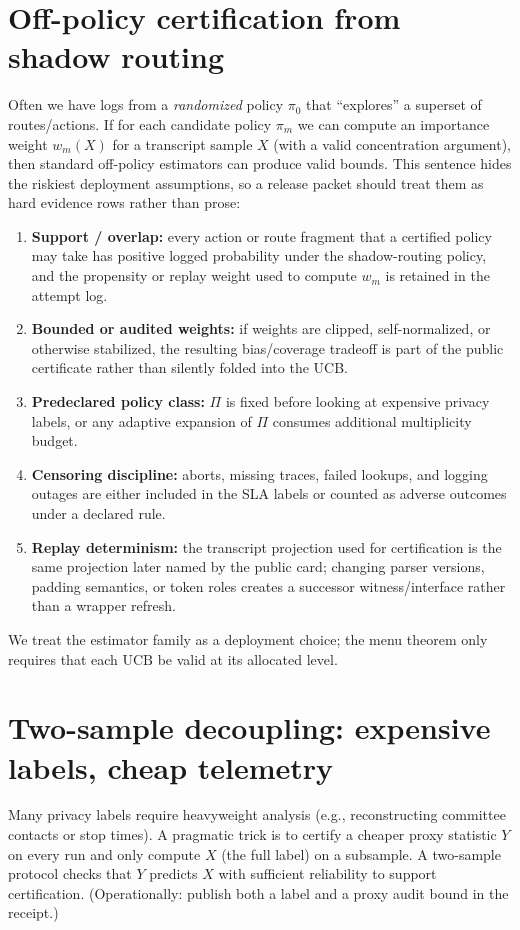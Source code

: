 \documentclass[11pt]{article}
\begin{document}
\section{Off-policy certification from shadow routing}
Often we have logs from a \emph{randomized} policy $\pi_0$ that ``explores'' a superset of routes/actions.
If for each candidate policy $\pi_m$ we can compute an importance weight $w_m(X)$ for a transcript sample $X$ (with a valid concentration argument), then standard off-policy estimators can produce valid bounds.\cite{huang2021offpolicy,kuzborskij2021confident}
This sentence hides the riskiest deployment assumptions, so a release packet should treat them as hard evidence rows rather than prose:
\begin{enumerate}[leftmargin=*]
\item \textbf{Support / overlap:} every action or route fragment that a certified policy may take has positive logged probability under the shadow-routing policy, and the propensity or replay weight used to compute $w_m$ is retained in the attempt log.
\item \textbf{Bounded or audited weights:} if weights are clipped, self-normalized, or otherwise stabilized, the resulting bias/coverage tradeoff is part of the public certificate rather than silently folded into the UCB.
\item \textbf{Predeclared policy class:} $\Pi$ is fixed before looking at expensive privacy labels, or any adaptive expansion of $\Pi$ consumes additional multiplicity budget.
\item \textbf{Censoring discipline:} aborts, missing traces, failed lookups, and logging outages are either included in the SLA labels or counted as adverse outcomes under a declared rule.
\item \textbf{Replay determinism:} the transcript projection used for certification is the same projection later named by the public card; changing parser versions, padding semantics, or token roles creates a successor witness/interface rather than a wrapper refresh.
\end{enumerate}
We treat the estimator family as a deployment choice; the menu theorem only requires that each $\mathrm{UCB}$ be valid at its allocated level.

\section{Two-sample decoupling: expensive labels, cheap telemetry}
Many privacy labels require heavyweight analysis (e.g., reconstructing committee contacts or stop times).
A pragmatic trick is to certify a cheaper proxy statistic $Y$ on every run and only compute $X$ (the full label) on a subsample.
A two-sample protocol checks that $Y$ predicts $X$ with sufficient reliability to support certification.
(Operationally: publish both a label and a proxy audit bound in the receipt.)
\end{document}
